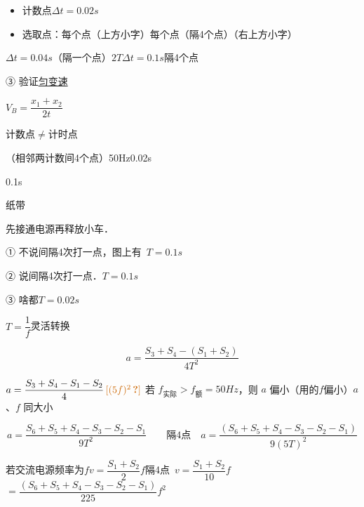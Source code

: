 
\begin{itemize}
\item 计数点\quad $\Delta t=0.02\unit{s}$ %
\item 选取点：每个点（上方小字）\quad 每个点（隔4个点）（右上方小字） %
\end{itemize}

\hspace{5em}$\Delta t=0.04\unit{s}$（隔一个点）$2T$\qquad\qquad $\Delta t=0.1\unit{s}$\quad 隔4个点

③ 验证\underline{匀变速}\ 

$V_B=\dfrac{x_1+x_2}{2t}$

计数点$\ne$计时点

（相邻两计数间4个点）\quad 50Hz\quad 0.02s

0.1s

\quad 纸带


先接通电源再释放小车．

① 不说间隔4次打一点，图上有\ $T=0.1\unit{s}$

② 说间隔4次打一点．$T=0.1\unit{s}$

③ 啥都\quad $T=0.02\unit{s}$

$T=\dfrac{1}{f}$\quad 灵活转换


\[
a=\frac{S_3+S_4-(S_1+S_2)}{4T^2}
\]

$a=\dfrac{S_3+S_4-S_1-S_2}{4}\,\unclear{(5f)^2}$ %
\quad 若 $f_{\text{实际}}>f_{\text{额}}=50\unit{Hz}$，则 $a$ 偏小\quad （用的$f$偏小）\quad $a$、$f$ 同大小 %

\[
a=\frac{S_6+S_5+S_4-S_3-S_2-S_1}{9T^2}\qquad\text{隔4点}\quad a=\frac{(S_6+S_5+S_4-S_3-S_2-S_1)}{9(5T)^2}
\]

若交流电源频率为$f$\quad $v=\dfrac{S_1+S_2}{2}f$\quad 隔4点\ $v=\dfrac{S_1+S_2}{10}f$\quad $=\dfrac{(S_6+S_5+S_4-S_3-S_2-S_1)}{225}f^2$

